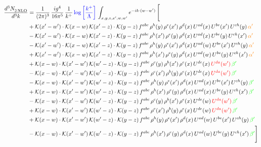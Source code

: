 \documentclass[9pt]{article}
\numberwithin{equation}{section}
\begin{document}
\begin{align}
  \frac{d^{3}N_{2\,\rm NLO}^{\rm}}{d^{3}k}  & = \frac{1}{(2\pi)^{3}}\, \frac{ig^{4}}{16\pi^{5}}\, \frac{1}{k^{+}}\, {\color{blue}\log{\left[\frac{k^{+}}{\Lambda}\right]}}\, \int_{x,y,z,x^{\prime},w,w^{\prime}}e^{-ik\cdot (w-w')}\, \Bigg[\notag \\ &   +\mathcal{K}(x'-w')\cdot\mathcal{K}(x-w)\,\mathcal{K}(x'-z)\cdot\mathcal{K}(y-z)\, f^{abc}\,\rho^{h}(y)\,\rho^{e}(x')\,\rho^{d}(x)\,U^{ad}(x)\,U^{be}(x')\,U^{ch}(y)\,{\color{orange}\alpha'}\notag\\ &-\mathcal{K}(x'-w')\cdot\mathcal{K}(x-w)\,\mathcal{K}(x'-z)\cdot\mathcal{K}(y-z)\, f^{abc}\,\rho^{h}(x')\,\rho^{e}(y)\,\rho^{d}(x)\,U^{ad}(x)\,U^{be}(y)\,U^{ch}(x')\,{\color{orange}\alpha'}\notag\\ &-\mathcal{K}(x'-w')\cdot\mathcal{K}(x-w)\,\mathcal{K}(x'-z)\cdot\mathcal{K}(y-z)\, f^{abc}\,\rho^{h}(y)\,\rho^{e}(x')\,\rho^{d}(x)\,U^{ad}(w)\,U^{be}(x')\,U^{ch}(y)\,{\color{orange}\alpha'}\notag \\ &+\mathcal{K}(x'-w')\cdot\mathcal{K}(x-w)\,\mathcal{K}(x'-z)\cdot\mathcal{K}(y-z)\, f^{abc}\,\rho^{h}(x')\,\rho^{e}(y)\,\rho^{d}(x)\,U^{ad}(w)\,U^{be}(y)\,U^{ch}(x')\,{\color{orange}\alpha'}\notag \\ & +\mathcal{K}(x-w)\cdot\mathcal{K}(x'-w')\,\mathcal{K}(w'-z)\cdot\mathcal{K}(y-z)\, f^{abc}\,\rho^{c}(y)\,\rho^{b}(x')\,\rho^{e}(x)\,U^{de}(x)\,{\color{red}U^{da}(w')}\,{\color{green}\beta'}\notag \\ &-\mathcal{K}(x-w)\cdot\mathcal{K}(x'-w')\,\mathcal{K}(w'-z)\cdot\mathcal{K}(y-z)\, f^{abc}\,\rho^{c}(x')\,\rho^{b}(y)\,\rho^{e}(x)\,U^{de}(x)\,{\color{red}U^{da}(w')}\,{\color{green}\beta'}\notag \\ & -\mathcal{K}(x-w)\cdot\mathcal{K}(x'-w')\,\mathcal{K}(w'-z)\cdot\mathcal{K}(y-z)\, f^{abc}\,\rho^{h}(y)\,\rho^{e}(x')\,\rho^{d}(x)\,U^{ad}(x)\,U^{be}(x')\,U^{ch}(y)\,{\color{green}\beta'}\notag\\ &+\mathcal{K}(x-w)\cdot\mathcal{K}(x'-w')\,\mathcal{K}(w'-z)\cdot\mathcal{K}(y-z)\, f^{abc}\,\rho^{h}(x')\,\rho^{e}(y)\,\rho^{d}(x)\,U^{ad}(x)\,U^{be}(y)\,U^{ch}(x')\,{\color{green}\beta'}\notag\\ &-\mathcal{K}(x-w)\cdot\mathcal{K}(x'-w')\,\mathcal{K}(w'-z)\cdot\mathcal{K}(y-z)\, f^{abc}\,\rho^{c}(y)\,\rho^{b}(x')\,\rho^{e}(x)\,U^{de}(w)\,{\color{red}U^{da}(w')}\,{\color{green}\beta'}\notag\\ &+\mathcal{K}(x-w)\cdot\mathcal{K}(x'-w')\,\mathcal{K}(w'-z)\cdot\mathcal{K}(y-z)\, f^{abc}\,\rho^{c}(x')\,\rho^{b}(y)\,\rho^{e}(x)\,U^{de}(w)\,{\color{red}U^{da}(w')}\,{\color{green}\beta'}\notag\\ &+\mathcal{K}(x-w)\cdot\mathcal{K}(x'-w')\,\mathcal{K}(w'-z)\cdot\mathcal{K}(y-z)\, f^{abc}\,\rho^{h}(y)\,\rho^{e}(x')\,\rho^{d}(x)\,U^{ad}(w)\,U^{be}(x')\,U^{ch}(y)\,{\color{green}\beta'}\notag \\ &-\mathcal{K}(x-w)\cdot\mathcal{K}(x'-w')\,\mathcal{K}(w'-z)\cdot\mathcal{K}(y-z)\, f^{abc}\,\rho^{h}(x')\,\rho^{e}(y)\,\rho^{d}(x)\,U^{ad}(w)\,U^{be}(y)\,U^{ch}(x')\,{\color{green}\beta'}\Bigg]
\end{align}  
\end{document}

